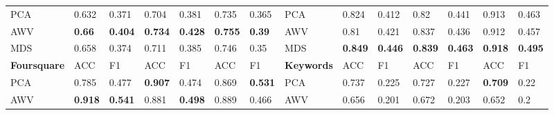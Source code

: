 {\begin{landscape}
\begin{table}[]
\begin{tabular}{llllllllllllll}
\toprule[\heavyrulewidth]
PCA        & 0.632                           & 0.371                           & 0.704                           & 0.381                           & 0.735                           & 0.365                           & PCA                             & 0.824                           & 0.412                           & 0.82                            & 0.441                           & 0.913                           & 0.463                           \\
AWV        & \textbf{0.66}  & \textbf{0.404} & \textbf{0.734} & \textbf{0.428} & \textbf{0.755} & \textbf{0.39}  & AWV                             & 0.81                            & 0.421                           & 0.837                           & 0.436                           & 0.912                           & 0.457                           \\
MDS        & 0.658                           & 0.374                           & 0.711                           & 0.385                           & 0.746                           & 0.35                            & MDS                             & \textbf{0.849} & \textbf{0.446} & \textbf{0.839} & \textbf{0.463} & \textbf{0.918} & \textbf{0.495} \\
\textbf{Foursquare} & ACC                             & F1                              & ACC                             & F1                              & ACC                             & F1                              & \textbf{Keywords}                        & ACC                             & F1                              & ACC                             & F1                              & ACC                             & F1                              \\
\toprule[\heavyrulewidth]
PCA        & 0.785                           & 0.477                           & \textbf{0.907} & 0.474                           & 0.869                           & \textbf{0.531} & PCA                             & 0.737                           & 0.225                           & 0.727                           & 0.227                           & \textbf{0.709} & 0.22                            \\
AWV        & \textbf{0.918} & \textbf{0.541} & 0.881                           & \textbf{0.498} & 0.889                           & 0.466                           & AWV                             & 0.656                           & 0.201                           & 0.672                           & 0.203                           & 0.652                           & 0.2                             \\

\end{tabular}
\end{table}
\end{landscape}}
